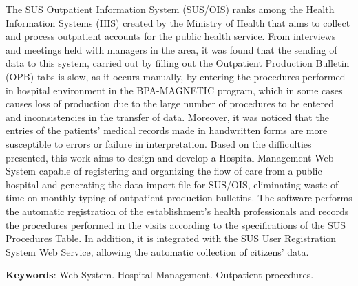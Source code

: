 \documentclass[
12pt,			     	%
a4paper,                %
oneside,                %
brazil		          	%
]{configuracoes}		%
\begin{document}
\begin{resumo}[ABSTRACT]

The SUS Outpatient Information System (SUS/OIS) ranks among the Health Information Systems (HIS) created by the Ministry of Health that aims to collect and process outpatient accounts for the public health service. From interviews and meetings held with managers in the area, it was found that the sending of data to this system, carried out by filling out the Outpatient Production Bulletin (OPB) tabs is slow, as it occurs manually, by entering the procedures performed in hospital environment in the BPA-MAGNETIC program, which in some cases causes loss of production due to the large number of procedures to be entered and inconsistencies in the transfer of data. Moreover, it was noticed that the entries of the patients' medical records made in handwritten forms are more susceptible to errors or failure in interpretation. Based on the difficulties presented, this work aims to design and develop a Hospital Management Web System capable of registering and organizing the flow of care from a public hospital and generating the data import file for SUS/OIS, eliminating waste of time on monthly typing of outpatient production bulletins. The software performs the automatic registration of the establishment's health professionals and records the procedures performed in the visits according to the specifications of the SUS Procedures Table. In addition, it is integrated with the SUS User Registration System Web Service, allowing the automatic collection of citizens’ data.

\noindent
\textbf{Keywords}: Web System. Hospital Management. Outpatient procedures.
    
\end{resumo}

\pagebreak





\listoffigures*
\cleardoublepage

\listoftables*
\cleardoublepage
\end{document}
